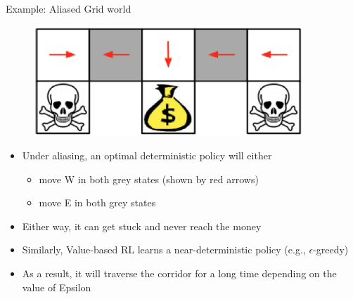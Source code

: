 \begin{frame}{Example: Aliased Grid world}
    \begin{figure}
        \centering
        \includegraphics[width=0.9\textwidth,height=0.3\textheight,keepaspectratio]{images/policy-search/grid_world_2.png}
    \end{figure}

    \begin{itemize}
        \item Under aliasing, an optimal deterministic policy will either
        \begin{itemize}
            \item move W in both grey states (shown by red arrows)
            \item move E in both grey states
        \end{itemize}
        \pause
        \item Either way, it can get stuck and never reach the money
        \pause
        \item Similarly, Value-based RL learns a near-deterministic policy (e.g., $\epsilon$-greedy)
        \item As a result, it will traverse the corridor for a long time depending on the value of Epsilon
    \end{itemize}
\end{frame}

